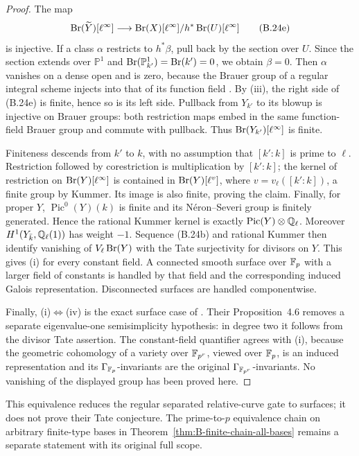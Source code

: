 \begin{proof}
The map
\[
 \operatorname{Br}(\widetilde Y)[\ell^\infty]
 \longrightarrow
 \operatorname{Br}(X)[\ell^\infty]/h^*\operatorname{Br}(U)[\ell^\infty]
 \tag{B.24e}
\]
is injective.  If a class \(\alpha\) restricts to \(h^*\beta\),
pull back by the section over \(U\).  Since the section extends
over \(\mathbb P^1\) and
\(\operatorname{Br}(\mathbb P^1_{k'})=\operatorname{Br}(k')=0\), we obtain \(\beta=0\).
Then \(\alpha\) vanishes on a dense open and is zero, because
the Brauer group of a regular integral scheme injects into that
of its function field
\cite[Corollary~1.8]{BGrothendieckBrauerII1966}.
By (iii), the right side of (B.24e) is finite, hence so is its
left side.  Pullback from \(Y_{k'}\) to its blowup is injective
on Brauer groups: both restriction maps embed in the same
function-field Brauer group and commute with pullback.
Thus \(\operatorname{Br}(Y_{k'})[\ell^\infty]\) is finite.

Finiteness descends from \(k'\) to \(k\), with no assumption
that \([k':k]\) is prime to \(\ell\).  Restriction followed
by corestriction is multiplication by \([k':k]\); the kernel of restriction
on \(\operatorname{Br}(Y)[\ell^\infty]\) is contained in
\(\operatorname{Br}(Y)[\ell^v]\), where \(v=v_\ell([k':k])\), a finite
group by Kummer.  Its image is also finite, proving the claim.
Finally, for proper \(Y\), \(\operatorname{Pic}^0(Y)(k)\) is
finite and its N\'eron--Severi group is finitely generated.  Hence
the rational Kummer kernel is exactly
\(\operatorname{Pic}(Y)\otimes\mathbb Q_\ell\).
Moreover \(H^1(Y_{\bar k},\mathbb Q_\ell(1))\)
has weight \(-1\).  Sequence (B.24b) and rational Kummer then
identify vanishing of \(V_\ell\operatorname{Br}(Y)\) with the Tate
surjectivity for divisors on \(Y\).  This gives (i) for every
constant field.  A connected smooth surface over \(\mathbb F_p\)
with a larger field of constants is handled by that field and
the corresponding induced Galois representation.  Disconnected
surfaces are handled componentwise.

Finally, (i)\(\Leftrightarrow\)(iv) is the exact surface case
of \citet[Theorem~7.1(1) and Remark~7.2]{BBalkanSchreieder2026}.
Their Proposition~4.6 removes a separate eigenvalue-one
semisimplicity hypothesis: in degree two it follows from the
divisor Tate assertion.  The constant-field quantifier agrees
with (i), because the geometric cohomology of a variety over
\(\mathbb F_{p^r}\), viewed over \(\mathbb F_p\), is an induced
representation and its \(\Gamma_{\mathbb F_p}\)-invariants are the
original \(\Gamma_{\mathbb F_{p^r}}\)-invariants.  No vanishing of
the displayed group has been proved here.
\end{proof}

This equivalence reduces the regular separated relative-curve
gate to surfaces; it does not prove their Tate conjecture.
The prime-to-\(p\) equivalence chain on arbitrary finite-type
bases in Theorem~\ref{thm:B-finite-chain-all-bases} remains a
separate statement with its original full scope.
